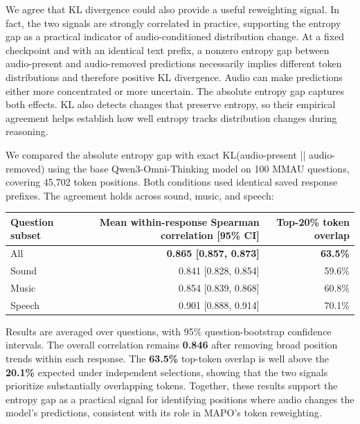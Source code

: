 We agree that KL divergence could also provide a useful reweighting signal. In fact, the two signals are strongly correlated in practice, supporting the entropy gap as a practical indicator of audio-conditioned distribution change. At a fixed checkpoint and with an identical text prefix, a nonzero entropy gap between audio-present and audio-removed predictions necessarily implies different token distributions and therefore positive KL divergence. Audio can make predictions either more concentrated or more uncertain. The absolute entropy gap captures both effects. KL also detects changes that preserve entropy, so their empirical agreement helps establish how well entropy tracks distribution changes during reasoning.

We compared the absolute entropy gap with exact KL(audio-present || audio-removed) using the base Qwen3-Omni-Thinking model on 100 MMAU questions, covering 45,702 token positions. Both conditions used identical saved response prefixes. The agreement holds across sound, music, and speech:

\par\medskip
\begingroup
\small
\setlength{\tabcolsep}{5pt}
\renewcommand{\arraystretch}{1.2}
\noindent\begin{tabularx}{\linewidth}{@{}LRR@{}}
\toprule
\textbf{Question subset} & \textbf{Mean within-response Spearman correlation [95\% CI]} & \textbf{Top-20\% token overlap} \\
\midrule
All & \textbf{0.865 [0.857, 0.873]} & \textbf{63.5\%} \\
Sound & 0.841 [0.828, 0.854] & 59.6\% \\
Music & 0.854 [0.839, 0.868] & 60.8\% \\
Speech & 0.901 [0.888, 0.914] & 70.1\% \\
\bottomrule
\end{tabularx}
\par\endgroup\medskip

Results are averaged over questions, with 95\% question-bootstrap confidence intervals. The overall correlation remains \textbf{0.846} after removing broad position trends within each response. The \textbf{63.5\%} top-token overlap is well above the \textbf{20.1\%} expected under independent selections, showing that the two signals prioritize substantially overlapping tokens. Together, these results support the entropy gap as a practical signal for identifying positions where audio changes the model's predictions, consistent with its role in MAPO's token reweighting.

